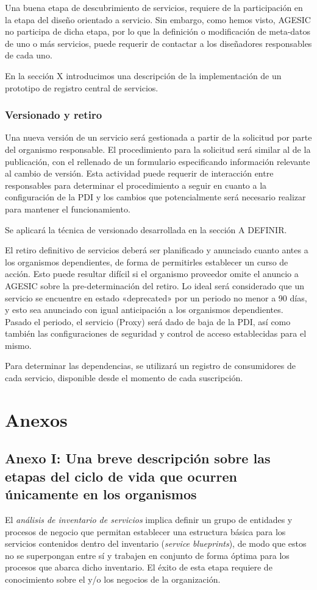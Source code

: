 \documentclass[11pt]{article}
\begin{document}
				Una buena etapa de descubrimiento de servicios, requiere de la participación en la etapa del diseño orientado a servicio. Sin embargo, como hemos visto, AGESIC no participa de dicha etapa, por lo que la definición o modificación de meta-datos de uno o más servicios, puede requerir de contactar a los diseñadores responsables de cada uno.

				En la sección X introducimos una descripción de la implementación de un prototipo de registro central de servicios.

			\subsubsection{Versionado y retiro}
				Una nueva versión de un servicio será gestionada a partir de la solicitud por parte del organismo responsable. El procedimiento para la solicitud será similar al de la publicación, con el rellenado de un formulario especificando información relevante al cambio de versión. Esta actividad puede requerir de interacción entre responsables para determinar el procedimiento a seguir en cuanto a la configuración de la PDI y los cambios que potencialmente será necesario realizar para mantener el funcionamiento.

				Se aplicará la técnica de versionado desarrollada en la sección A DEFINIR.

				El retiro definitivo de servicios deberá ser planificado y anunciado cuanto antes a los organismos dependientes, de forma de permitirles establecer un curso de acción. Esto puede resultar difícil si el organismo proveedor omite el anuncio a AGESIC sobre la pre-determinación del retiro. Lo ideal será considerado que un servicio se encuentre en estado «deprecated» por un periodo no menor a 90 días, y esto sea anunciado con igual anticipación a los organismos dependientes. Pasado el periodo, el servicio (Proxy) será dado de baja de la PDI, así como también las configuraciones de seguridad y control de acceso establecidas para el mismo.

				Para determinar las dependencias, se utilizará un registro de consumidores de cada servicio, disponible desde el momento de cada suscripción.


	\section{Anexos}
		\subsection{Anexo I: Una breve descripción sobre las etapas del ciclo de vida que ocurren únicamente en los organismos}
			El \emph{análisis de inventario de servicios} implica definir un grupo de entidades y procesos de negocio que permitan establecer una estructura básica para los servicios contenidos dentro del inventario (\emph{service blueprints}), de modo que estos no se superpongan entre sí y trabajen en conjunto de forma óptima para los procesos que abarca dicho inventario. El éxito de esta etapa requiere de conocimiento sobre el y/o los negocios de la organización.
\end{document}
